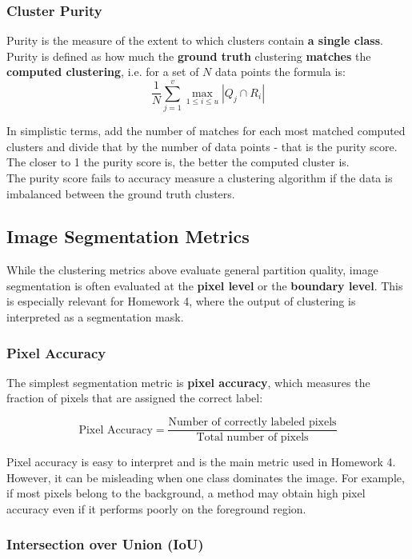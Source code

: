 \documentclass{article}
\begin{document}
\subsubsection{Cluster Purity}
Purity is the measure of the extent to which clusters contain \textbf{a single class}.\\
Purity is defined as how much the \textbf{ground truth} clustering \textbf{matches} the \textbf{computed clustering}, i.e. for a set of $N$ data points the formula is:\[
\frac{1}{N} \sum_{j=1}^{v} \max_{1 \leq i \leq u} |Q_j \cap R_i|
\]

In simplistic terms, add the number of matches for each most matched computed clusters and divide that by the number of data points - that is the purity score. The closer to 1 the purity score is, the better the computed cluster is.\\
The purity score fails to accuracy measure a clustering algorithm if the data is imbalanced between the ground truth clusters.\\

\subsection{Image Segmentation Metrics}

While the clustering metrics above evaluate general partition quality, image segmentation is often evaluated at the \textbf{pixel level} or the \textbf{boundary level}. This is especially relevant for Homework 4, where the output of clustering is interpreted as a segmentation mask.

\subsubsection{Pixel Accuracy}

The simplest segmentation metric is \textbf{pixel accuracy}, which measures the fraction of pixels that are assigned the correct label:

\[
\text{Pixel Accuracy} = \frac{\text{Number of correctly labeled pixels}}{\text{Total number of pixels}}
\]

Pixel accuracy is easy to interpret and is the main metric used in Homework 4. However, it can be misleading when one class dominates the image. For example, if most pixels belong to the background, a method may obtain high pixel accuracy even if it performs poorly on the foreground region.

\subsubsection{Intersection over Union (IoU)}
\end{document}
